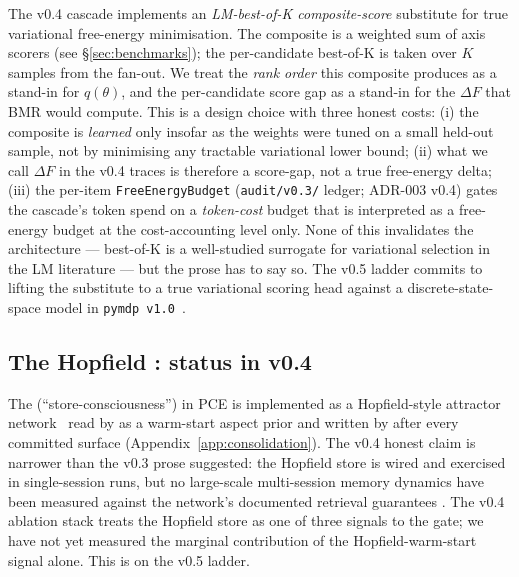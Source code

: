 The v0.4 cascade implements an \emph{LM-best-of-K composite-score} substitute for true variational free-energy minimisation. The composite is a weighted sum of axis scorers (see \S\ref{sec:benchmarks}); the per-candidate best-of-K is taken over $K$ samples from the  fan-out. We treat the \emph{rank order} this composite produces as a stand-in for $q(\theta)$, and the per-candidate score gap as a stand-in for the $\Delta F$ that BMR would compute. This is a design choice with three honest costs: (i) the composite is \emph{learned} only insofar as the weights were tuned on a small held-out sample, not by minimising any tractable variational lower bound; (ii) what we call $\Delta F$ in the v0.4 traces is therefore a score-gap, not a true free-energy delta; (iii) the per-item \texttt{FreeEnergyBudget} (\texttt{audit/v0.3/} ledger; ADR-003 v0.4) gates the cascade's token spend on a \emph{token-cost} budget that is interpreted as a free-energy budget at the cost-accounting level only. None of this invalidates the architecture --- best-of-K is a well-studied surrogate for variational selection in the LM literature \citep{StiennonEtAl2020LearningToSummarizeFromHumanFeedback,MadaanEtAl2023SelfRefineNeurIPS} --- but the prose has to say so. The v0.5 ladder commits to lifting the substitute to a true variational scoring head against a discrete-state-space model in \texttt{pymdp v1.0}~\citep{Heins2022pymdp,pymdpRelease100}.

\subsection{The Hopfield : status in v0.4}

The  (``store-consciousness'') in PCE is implemented as a Hopfield-style attractor network~\citep{KrotovHopfield2016DenseAssociativeMemory,RamsauerEtAl2020HopfieldNetworksIsAllYouNeed,Mtenga2024HopfieldCreativity,Weber2025SelfOptHopfield} read by  as a warm-start aspect prior and written by  after every committed surface (Appendix~\ref{app:consolidation}). The v0.4 honest claim is narrower than the v0.3 prose suggested: the Hopfield store is wired and exercised in single-session runs, but no large-scale multi-session memory dynamics have been measured against the network's documented retrieval guarantees \citep{RamsauerEtAl2020HopfieldNetworksIsAllYouNeed}. The v0.4 ablation stack treats the Hopfield store as one of three signals to the  gate; we have not yet measured the marginal contribution of the Hopfield-warm-start signal alone. This is on the v0.5 ladder.

